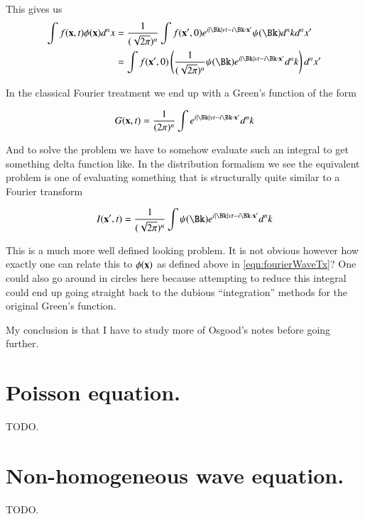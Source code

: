 This gives us
\begin{align*}
\int {f}(\Bx,t) \phi(\Bx) d^n x 
&= \frac{1}{(\sqrt{2\pi})^n} \int {f}(\Bx',0) e^{i \Abs{\Bk} v t - i \Bk \cdot \Bx' } \psi(\Bk) d^n k d^n x' \\
&= 
\int {f}(\Bx',0) \left( \frac{1}{(\sqrt{2\pi})^n} \psi(\Bk) e^{i \Abs{\Bk} v t - i \Bk \cdot \Bx' } d^n k 
\right) d^n x' \\
\end{align*}

In the classical Fourier treatment we end up with a Green's function of the form

\begin{align*}
G(\Bx, t) = \frac{1}{({2\pi})^n} \int e^{i \Abs{\Bk} v t - i \Bk \cdot \Bx' } d^n k 
\end{align*}

And to solve the problem we have to somehow evaluate such an integral to get something delta function like.  In the distribution
formalism we see the equivalent problem is one of evaluating something that is structurally quite similar to
a Fourier transform

\begin{align*}
I(\Bx', t) = \frac{1}{(\sqrt{2\pi})^n} \int \psi(\Bk) e^{i \Abs{\Bk} v t - i \Bk \cdot \Bx' } d^n k 
\end{align*}

This is a much more well defined looking problem.  It is not obvious however how exactly one can relate this to $\phi(\mathbf{x})$ as defined above in \ref{eqn:fourierWaveTx}?  One could also go around in circles here because attempting to reduce this integral could end up going straight back to the dubious ``integration'' methods for the original Green's function.

My conclusion is that I have to study more of Osgood's notes before going further.

\section{Poisson equation. }

TODO.

\section{Non-homogeneous wave equation. }

TODO.

%
%

%
